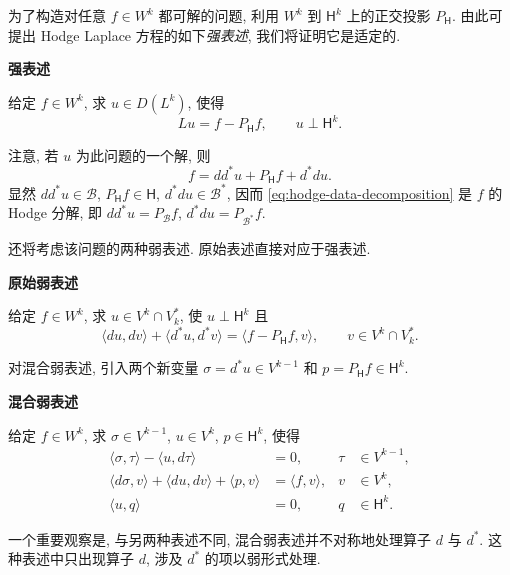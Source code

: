 为了构造对任意 $f\in W^k$ 都可解的问题, 利用 $W^k$ 到 $\mathsf H^k$ 上的正交投影 $P_{\mathsf H}$. 由此可提出 Hodge Laplace 方程的如下\emph{强表述}, 我们将证明它是适定的.

\medskip\noindent\textbf{{强表述}}\par
给定 $f\in W^k$, 求 $u\in D(L^k)$, 使得
\begin{equation}\label{eq:hodge-strong-formulation}
Lu=f-P_{\mathsf H}f,\qquad u\perp\mathsf H^k.
\end{equation}

注意, 若 $u$ 为此问题的一个解, 则
\begin{equation}\label{eq:hodge-data-decomposition}
f=dd^*u+P_{\mathsf H}f+d^*du.
\end{equation}
显然 $dd^*u\in\mathcal B$, $P_{\mathsf H}f\in\mathsf H$, $d^*du\in\mathcal B^*$, 因而 \eqref{eq:hodge-data-decomposition} 是 $f$ 的 Hodge 分解, 即 $dd^*u=P_{\mathcal B}f$, $d^*du=P_{\mathcal B^*}f$.

还将考虑该问题的两种弱表述. 原始表述直接对应于强表述.

\medskip\noindent\textbf{{原始弱表述}}\par
给定 $f\in W^k$, 求 $u\in V^k\cap V_k^*$, 使 $u\perp\mathsf H^k$ 且
\begin{equation}\label{eq:hodge-primal-formulation}
\langle du,dv\rangle+\langle d^*u,d^*v\rangle=\langle f-P_{\mathsf H}f,v\rangle,\qquad v\in V^k\cap V_k^*.
\end{equation}

对混合弱表述, 引入两个新变量 $\sigma=d^*u\in V^{k-1}$ 和 $p=P_{\mathsf H}f\in\mathsf H^k$.

\medskip\noindent\textbf{{混合弱表述}}\par
给定 $f\in W^k$, 求 $\sigma\in V^{k-1}$, $u\in V^k$, $p\in\mathsf H^k$, 使得
\begin{equation}\label{eq:hodge-mixed-formulation}
\begin{aligned}
\langle\sigma,\tau\rangle-\langle u,d\tau\rangle&=0,&\tau&\in V^{k-1},\\
\langle d\sigma,v\rangle+\langle du,dv\rangle+\langle p,v\rangle&=\langle f,v\rangle,&v&\in V^k,\\
\langle u,q\rangle&=0,&q&\in\mathsf H^k.
\end{aligned}
\end{equation}

一个重要观察是, 与另两种表述不同, 混合弱表述并不对称地处理算子 $d$ 与 $d^*$. 这种表述中只出现算子 $d$, 涉及 $d^*$ 的项以弱形式处理.

